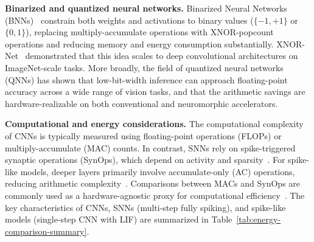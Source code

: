 \documentclass{ieeeaccess}
\begin{document}
\vspace{0.3em}
\noindent\textbf{Binarized and quantized neural networks.}
Binarized Neural Networks (BNNs)~\cite{courbariaux2016binarized} constrain both weights and activations to binary values ($\{-1,+1\}$ or $\{0,1\}$), replacing multiply-accumulate operations with XNOR-popcount operations and reducing memory and energy consumption substantially. XNOR-Net~\cite{rastegari2016xnor} demonstrated that this idea scales to deep convolutional architectures on ImageNet-scale tasks. More broadly, the field of quantized neural networks (QNNs) has shown that low-bit-width inference can approach floating-point accuracy across a wide range of vision tasks, and that the arithmetic savings are hardware-realizable on both conventional and neuromorphic accelerators.


\vspace{0.3em}
\noindent\textbf{Computational and energy considerations.}  
The compu\-tational complexity of CNNs is typically measured using floating-point operations (FLOPs) or multiply-accumulate (MAC) counts. In contrast, SNNs rely on spike-triggered synaptic operations (SynOps), which depend on activity and sparsity~\cite{roy2019towards, davies2018loihi, plagwitz2023to}. For spike-like models, deeper layers primarily involve accumulate-only (AC) operations, reducing arithmetic complexity~\cite{chen2023training}. Comparisons between MACs and SynOps are commonly used as a hardware-agnostic proxy for computational efficiency~\cite{lemaire2023estimation}. The key characteristics of CNNs, SNNs (multi-step fully spiking), and spike-like models (single-step CNN with LIF) are summarized in Table~\ref{tab:energy-comparison-summary}.
\end{document}
